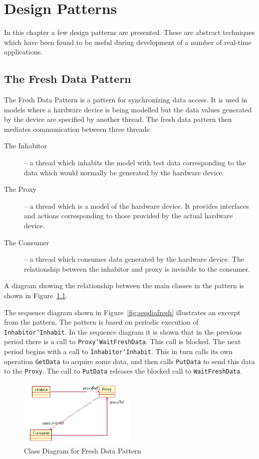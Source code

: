 \documentclass{overturerepchap}
\begin{document}
\chapter{Design Patterns}\label{app:patterns}

In this chapter a few design patterns are presented. These are abstract
techniques which have been found to be useful during development of a
number of real-time applications.

\section{The Fresh Data Pattern}

The Fresh Data Pattern is a pattern for synchronizing data access. It
is used in models where a hardware device is being modelled but the
data values generated by the device are specified by another
thread. The fresh data pattern then mediates communication between
three threads:

\begin{description}
\item[The Inhabitor] -- a thread which inhabits the model with test
data corresponding to the data which would normally be generated by
the hardware device.
\item[The Proxy] -- a thread which is a model of the hardware
device. It provides interfaces and actions corresponding to those
provided by the actual hardware device.
\item[The Consumer] -- a thread which consumes data generated by the
hardware device.  The relationship between the inhabitor and proxy is
invisible to the consumer.
\end{description}

A diagram showing the relationship between the main classes in the
pattern is shown in Figure~\ref{fig:freshdata}.

The sequence diagram shown in Figure~\ref{fig:seqdiafresh} illustrates
an excerpt from the pattern. The pattern is based on periodic
execution of \texttt{Inhabitor`Inhabit}. In the sequence diagram it is
shown that in the previous period there is a call to
\texttt{Proxy`WaitFreshData}. This call is blocked. The next period
begins with a call to \texttt{Inhabitor`Inhabit}. This in turn calls
its own operation \texttt{GetData} to acquire some data, and then
calls \texttt{PutData} to send this data to the \texttt{Proxy}. The call to
\texttt{PutData} releases the blocked call to \texttt{WaitFreshData}.

\begin{figure}
\begin{center}
\includegraphics[width=0.5\textwidth]{figures/freshdata.png}
\end{center}
\caption{Class Diagram for Fresh Data Pattern\label{fig:freshdata}}
\end{figure}
\end{document}
